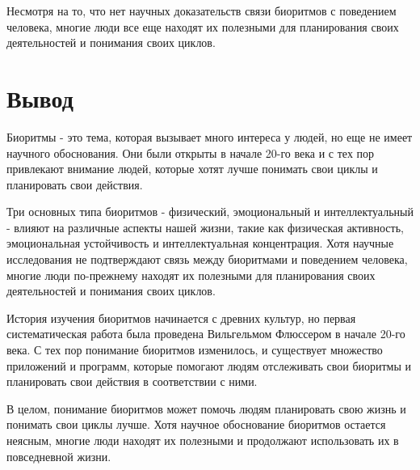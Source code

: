 Несмотря на то, что нет научных доказательств связи биоритмов с поведением человека, многие люди все еще находят их полезными для планирования своих деятельностей и понимания своих циклов.

\section{Вывод}

Биоритмы - это тема, которая вызывает много интереса у людей, но еще не имеет научного обоснования. Они были открыты в начале 20-го века и с тех пор привлекают внимание людей, которые хотят лучше понимать свои циклы и планировать свои действия.

Три основных типа биоритмов - физический, эмоциональный и интеллектуальный - влияют на различные аспекты нашей жизни, такие как физическая активность, эмоциональная устойчивость и интеллектуальная концентрация. Хотя научные исследования не подтверждают связь между биоритмами и поведением человека, многие люди по-прежнему находят их полезными для планирования своих деятельностей и понимания своих циклов.

История изучения биоритмов начинается с древних культур, но первая систематическая работа была проведена Вильгельмом Флюссером в начале 20-го века. С тех пор понимание биоритмов изменилось, и существует множество приложений и программ, которые помогают людям отслеживать свои биоритмы и планировать свои действия в соответствии с ними.

В целом, понимание биоритмов может помочь людям планировать свою жизнь и понимать свои циклы лучше. Хотя научное обоснование биоритмов остается неясным, многие люди находят их полезными и продолжают использовать их в повседневной жизни.